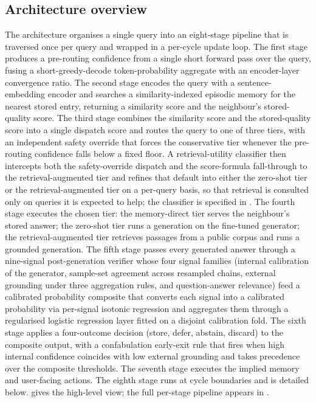 \subsection{Architecture overview}
\label{sec:arch-overview}

The architecture organises a single query into an eight-stage pipeline that is traversed once per query and wrapped in a per-cycle update loop. The first stage produces a pre-routing confidence from a single short forward pass over the query, fusing a short-greedy-decode token-probability aggregate with an encoder-layer convergence ratio. The second stage encodes the query with a sentence-embedding encoder and searches a similarity-indexed episodic memory for the nearest stored entry, returning a similarity score and the neighbour's stored-quality score. The third stage combines the similarity score and the stored-quality score into a single dispatch score and routes the query to one of three tiers, with an independent safety override that forces the conservative tier whenever the pre-routing confidence falls below a fixed floor. A retrieval-utility classifier then intercepts both the safety-override dispatch and the score-formula fall-through to the retrieval-augmented tier and refines that default into either the zero-shot tier or the retrieval-augmented tier on a per-query basis, so that retrieval is consulted only on queries it is expected to help; the classifier is specified in . The fourth stage executes the chosen tier: the memory-direct tier serves the neighbour's stored answer; the zero-shot tier runs a generation on the fine-tuned generator; the retrieval-augmented tier retrieves passages from a public corpus and runs a grounded generation. The fifth stage passes every generated answer through a nine-signal post-generation verifier whose four signal families (internal calibration of the generator, sample-set agreement across resampled chains, external grounding under three aggregation rules, and question-answer relevance) feed a calibrated probability composite that converts each signal into a calibrated probability via per-signal isotonic regression and aggregates them through a regularised logistic regression layer fitted on a disjoint calibration fold. The sixth stage applies a four-outcome decision (store, defer, abstain, discard) to the composite output, with a confabulation early-exit rule that fires when high internal confidence coincides with low external grounding and takes precedence over the composite thresholds. The seventh stage executes the implied memory and user-facing actions. The eighth stage runs at cycle boundaries and is detailed below.  gives the high-level view; the full per-stage pipeline appears in .

